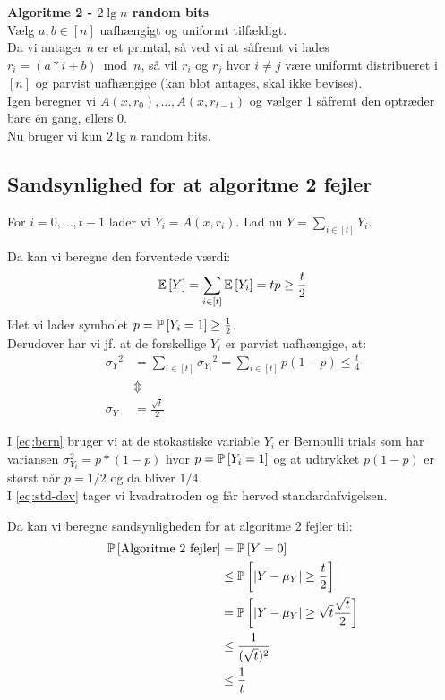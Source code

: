 \textbf{Algoritme 2 - $2 \lg n$ random bits}\\
Vælg $a, b \in [n]$ uafhængigt og uniformt tilfældigt.\\

Da vi antager $n$ er et primtal, så ved vi at såfremt vi lades $r_i = (a * i + b) \bmod n$, så vil $r_i$ og $r_j$ hvor $i \neq j$ være uniformt distribueret i $[n]$ og parvist uafhængige (kan blot antages, skal ikke bevises).\\

Igen beregner vi $A(x, r_0), \dots, A(x, r_{t-1})$ og vælger 1 såfremt den optræder bare én gang, ellers 0.\\

Nu bruger vi kun $2 \lg n$ random bits.

\subsection{Sandsynlighed for at algoritme 2 fejler}
For $i = 0, \dots, t-1$ lader vi $Y_i = A(x, r_i)$. Lad nu $Y = \sum_{i \in [t]} Y_i$.

Da kan vi beregne den forventede værdi:
\begin{align}
  \E{Y} = \sum_{i \in [t]} \E{Y_i} = tp \geq \frac{t}{2} \label{eq:mu-y-ulighed}
\end{align}
Idet vi lader symbolet $p = \P{Y_i = 1} \geq \frac{1}{2}$.\\

Derudover har vi jf. at de forskellige $Y_i$ er parvist uafhængige, at:
\begin{align}
  {\sigma_Y}^2
  &= \sum_{i \in [t]} {\sigma_{Y_i}}^2
  = \sum_{i \in [t]} p(1-p)
  \leq \frac{t}{4} \label{eq:bern} \\
  &\Updownarrow \nonumber  \\
  \sigma_Y &= \frac{\sqrt{t}}{2}  \label{eq:std-dev}
\end{align}

I \cref{eq:bern} bruger vi at de stokastiske variable $Y_i$ er Bernoulli trials som har variansen $\sigma_{Y_i}^2 = p*(1-p)$ hvor $p = \P{Y_i = 1}$ og at udtrykket $p(1 - p)$ er størst når $p = 1/2$ og da bliver $1/4$.\\
I \cref{eq:std-dev} tager vi kvadratroden og får herved standardafvigelsen.


Da kan vi beregne sandsynligheden for at algoritme 2 fejler til:
\begin{align}
  \P{\text{Algoritme 2 fejler}} &= \P{Y = 0} \label{eq:p-y-lig-0} \\
  &\leq \P{| Y - \mu_Y| \geq \frac{t}{2}} \label{eq:traak-middelvaardi} \\
  &= \P{|Y - \mu_Y| \geq \sqrt{t} \frac{\sqrt{t}}{2}} \nonumber \\
  &\leq \frac{1}{(\sqrt{t})^2} \label{eq:benyt-cheby}\\
  &\leq \frac{1}{t} \nonumber
\end{align}

